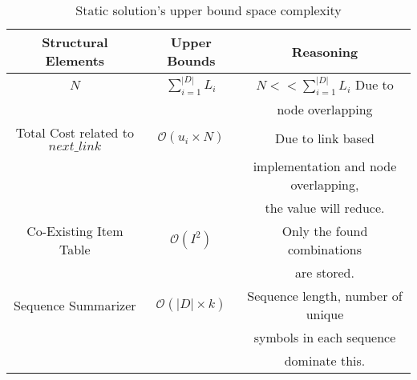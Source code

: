 \begin{table}[!t]

\centering
\begin{tabular}{|c|c|c|}
\hline
Structural Elements & Upper Bounds & Reasoning\\
\hline
$N$  & $\sum_{i=1}^{|D|} L_{i}$ & $N << \sum_{i=1}^{|D|} L_{i}$ Due to \\
& & node overlapping \\ \hline
Total Cost related to $next\_link$ & $\mathcal{O}(u_{i} \times N)$ & Due to link based\\
& & implementation and node overlapping,\\
& & the value will reduce.\\ \hline
Co-Existing Item Table & $\mathcal{O}(I^{2})$ & Only the found combinations \\
& & are stored. \\ \hline
Sequence Summarizer & $\mathcal{O}(|D| \times k)$ & Sequence length, number of unique \\
& & symbols in each sequence \\
& & dominate this.\\ 
\hline
\end{tabular}
\caption{Static solution's upper bound space complexity}
\label{table:space_complexity_tree_miner}
\end{table}

